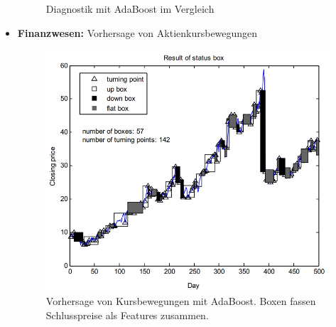 \begin{itemize}
\begin{figure}
              \caption{Diagnostik mit AdaBoost im Vergleich \cite{hatwell2020ada}}
          \end{figure}
    \item \textbf{Finanzwesen:} Vorhersage von Aktienkursbewegungen~\cite{zhang2016stock}
          \begin{figure}
              \centering
              \includegraphics[width=.65\textwidth]{figures/stock.png}
              \caption{Vorhersage von Kursbewegungen mit AdaBoost. Boxen fassen Schlusspreise als Features zusammen. \cite{zhang2016stock}}
          \end{figure}
\end{itemize}



